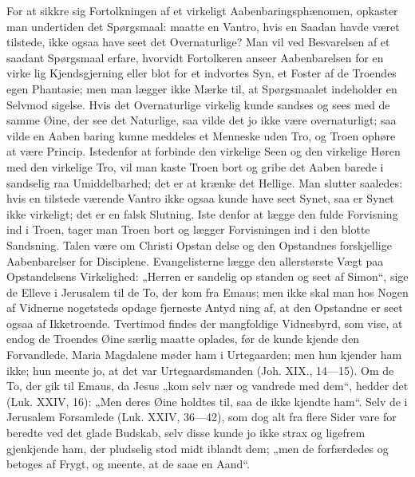 \documentclass[12pt]{book}
\newcommand{\opage}[1]{\marginnote{\footnotesize\textit{[#1]}}}
\begin{document}
For at sikkre sig Fortolkningen af et virkeligt
Aabenbaringsphænomen, opkaster man undertiden det
Spørgsmaal: maatte en Vantro, hvis en Saadan havde
været tilstede, ikke ogsaa have seet det Overnaturlige?
Man vil ved Besvarelsen af et saadant Spørgsmaal erfare,
hvorvidt Fortolkeren anseer Aabenbarelsen for en virke\-%
lig Kjendsgjerning eller blot for et indvortes Syn, et
Foster af de Troendes egen Phantasie; men man lægger
ikke Mærke til, at Spørgsmaalet indeholder en Selvmod\-%
sigelse. Hvis det Overnaturlige virkelig kunde sandses
og sees med de samme Øine, der see det Naturlige, saa
vilde det jo ikke være overnaturligt; saa vilde en Aaben\-%
baring kunne meddeles et Menneske uden Tro, og Troen
\opage{172}\setcounter{footnote}{0}%
ophøre at være Princip. Istedenfor at forbinde den
virkelige Seen og den virkelige Høren med den virkelige
Tro, vil man kaste Troen bort og gribe det Aaben\-%
barede i sandselig raa Umiddelbarhed; det er at krænke
det Hellige. Man slutter saaledes: hvis en tilstede\-%
værende Vantro ikke ogsaa kunde have seet Synet, saa
er Synet ikke virkeligt; det er en falsk Slutning. Iste\-%
denfor at lægge den fulde Forvisning ind i Troen,
tager man Troen bort og lægger Forvisningen ind i
den blotte Sandsning. Talen være om Christi Opstan\-%
delse og den Opstandnes forskjellige Aabenbarelser for
Disciplene. Evangelisterne lægge den allerstørste Vægt
paa Opstandelsens Virkelighed: „Herren er sandelig op\-%
standen og seet af Simon“, sige de Elleve i Jerusalem
til de To, der kom fra Emaus; men ikke skal man hos
Nogen af Vidnerne nogetsteds opdage fjerneste Antyd\-%
ning af, at den Opstandne er seet ogsaa af Ikketroende.
Tvertimod findes der mangfoldige Vidnesbyrd, som vise,
at endog de Troendes Øine særlig maatte oplades, før
de kunde kjende den Forvandlede. Maria Magdalene
møder ham i Urtegaarden; men hun kjender ham ikke;
hun meente jo, at det var Urtegaardsmanden (Joh. XIX.,
14---15). Om de To, der gik til Emaus, da Jesus „kom
selv nær og vandrede med dem“, hedder det (Luk.
XXIV, 16): „Men deres Øine holdtes til, saa de ikke
kjendte ham“. Selv de i Jerusalem Forsamlede (Luk.
XXIV, 36---42), som dog alt fra flere Sider vare for\-%
beredte ved det glade Budskab, selv disse kunde jo ikke
strax og ligefrem gjenkjende ham, der pludselig stod
midt iblandt dem; „men de forfærdedes og betoges af
Frygt, og meente, at de saae en Aand“.
\end{document}
